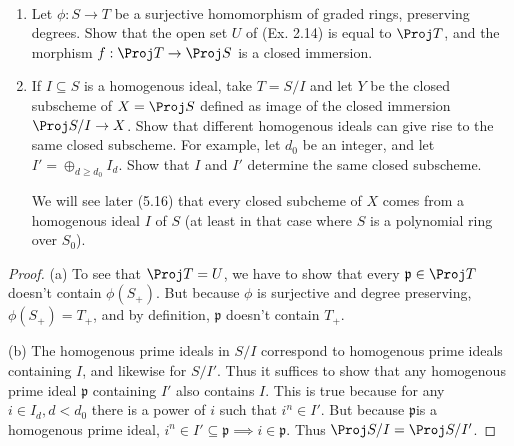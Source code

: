\begin{exercise}
	~
	\begin{enumerate}
		\item Let $\phi : S\to T $ be a surjective homomorphism of graded rings, preserving degrees. Show that the open set $U $ of (Ex. 2.14) is equal to $\Proj T $, and the morphism $f: \Proj T \to \Proj S $ is a closed immersion.
		\item If $I \subseteq S $ is a homogenous ideal, take $T = S / I $ and let $Y $ be the closed subscheme of $X = \Proj S $ defined as image of the closed immersion $\Proj S / I \to X $. Show that different homogenous ideals can give rise to the same closed subscheme. For example, let $d_{0} $ be an integer, and let $I' = \oplus _{d \ge d_{0}} I_d $. Show that $I $ and $I' $ determine the same closed subscheme.

			We will see later (5.16) that every closed subcheme of $X $ comes from a homogenous ideal $I $ of $S $ (at least in that case where $S $ is a polynomial ring over $S_{0} $).
	\end{enumerate}
\end{exercise}
\begin{proof}
	(a) To see that $\Proj T = U $, we have to show that every $\mathfrak{p} \in \Proj T $ doesn't contain $\phi (S_+) $.
	But because $\phi$ is surjective and degree preserving, $\phi (S_+) = T_+ $, and by definition, $\mathfrak{p} $ doesn't contain $T_+ $.

	(b) The homogenous prime ideals in $S / I $ correspond to homogenous prime ideals containing $I $, and likewise for $S / I' $.
	Thus it suffices to show that any homogenous prime ideal $\mathfrak{p} $ containing $I' $ also contains $I $.
	This is true because for any $i \in I_d, d < d_{0} $ there is a power of $i$ such that $i^n \in I'$.
	But because $\mathfrak{p} $is a homogenous prime ideal, $i^n \in I' \subseteq \mathfrak{p} \implies i \in \mathfrak{p} $.
	Thus $\Proj S / I = \Proj S / I' $.
\end{proof}

